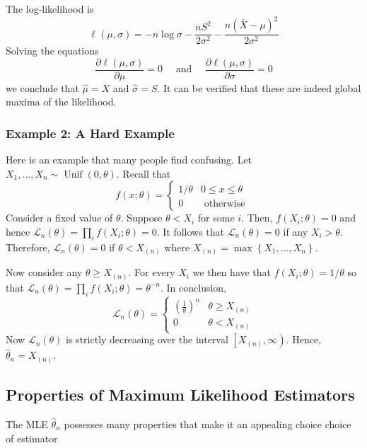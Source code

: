 The log-likelihood is
\[
\ell(\mu, \sigma)=-n \log \sigma-\frac{n S^2}{2 \sigma^2}-\frac{n(\overline{X}-\mu)^2}{2 \sigma^2}
\]
Solving the equations
\[
\frac{\partial \ell(\mu, \sigma)}{\partial \mu}=0 \quad \text { and } \quad \frac{\partial \ell(\mu, \sigma)}{\partial \sigma}=0
\]
we conclude that $\widehat{\mu}=\overline{X}$ and $\widehat{\sigma}=S$. It can be verified that these are indeed global maxima of the likelihood.

\subsubsection{Example 2: A Hard Example}

Here is an example that many people find confusing. Let $X_1, \ldots, X_n \sim \operatorname{Unif}(0, \theta)$. Recall that
\[
f(x ; \theta)= \begin{cases}1 / \theta & 0 \leq x \leq \theta \\ 0 & \text { otherwise }\end{cases}
\]
Consider a fixed value of $\theta$. Suppose $\theta<X_i$ for some $i$. Then, $f(X_i ; \theta)=0$ and hence $\mathcal{L}_n(\theta)=\prod_i f(X_i ; \theta)=0$. It follows that $\mathcal{L}_n(\theta)=0$ if any $X_i>\theta$. Therefore, $\mathcal{L}_n(\theta)=0$ if $\theta<X_{(n)}$ where $X_{(n)}=\max \left\{X_1, \ldots, X_n\right\}$.

Now consider any $\theta \geq X_{(n)}$. For every $X_i$ we then have that $f(X_i ; \theta)=1 / \theta$ so that $\mathcal{L}_n(\theta)=\prod_i f(X_i ; \theta)=\theta^{-n}$. In conclusion,
\[
\mathcal{L}_n(\theta)= \begin{cases}\left(\frac{1}{\theta}\right)^n & \theta \geq X_{(n)} \\ 0 & \theta<X_{(n)}\end{cases}
\]
Now $\mathcal{L}_n(\theta)$ is strictly decreasing over the interval $\left[X_{(n)}, \infty\right)$. Hence, $\widehat{\theta}_n=X_{(n)}$.

\subsection{Properties of Maximum Likelihood Estimators}

The MLE $\widehat{\theta}_n$ possesses many properties that make it an appealing choice choice of estimator

